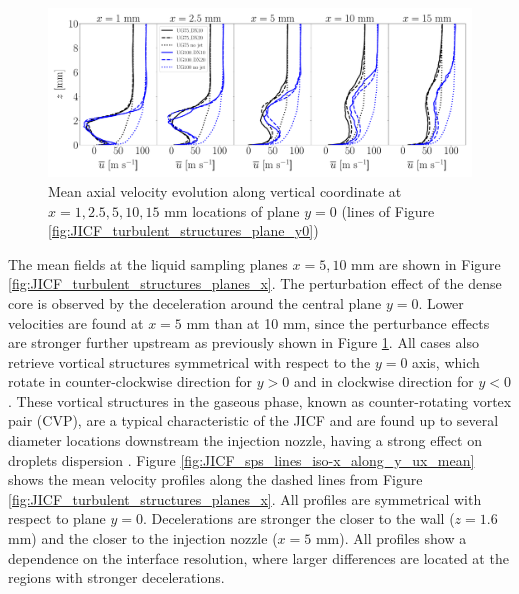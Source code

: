 \begin{figure}[ht]
\flushleft
   \includegraphics[scale=0.24]{./part2_developments/figures_ch5_resolved_JICF/turbulent_structures/lines_y0_along_z_ux_mean}
\caption{Mean axial velocity evolution along vertical coordinate at $x = 1, 2.5, 5, 10, 15$ mm locations of plane $y = 0$ (lines of Figure \ref{fig:JICF_turbulent_structures_plane_y0})}
\label{fig:JICF_sps_lines_y0_along_z_ux_mean}
\end{figure}


The mean fields at the liquid sampling planes $x = 5, 10$ mm are shown in Figure \ref{fig:JICF_turbulent_structures_planes_x}.  The perturbation effect of the dense core is observed by the deceleration around the central plane $y = 0$. Lower velocities are found at $x = 5$ mm than at 10 mm, since the perturbance effects are stronger further upstream as previously shown in Figure \ref{fig:JICF_sps_lines_y0_along_z_ux_mean}. All cases also retrieve vortical structures symmetrical with respect to the $y = 0$ axis, which rotate in counter-clockwise direction for $y > 0$ and in clockwise direction for  $y < 0$. These vortical structures in the gaseous phase, known as counter-rotating vortex pair (CVP), are a typical characteristic of the JICF and are found up to several diameter locations downstream the injection nozzle, having a strong effect on droplets dispersion . Figure \ref{fig:JICF_sps_lines_iso-x_along_y_ux_mean} shows the mean velocity profiles along the dashed lines from Figure \ref{fig:JICF_turbulent_structures_planes_x}. All profiles are symmetrical with respect to plane $y = 0$. Decelerations are stronger the closer to the wall ($z = 1.6$ mm) and the closer to the injection nozzle ($x = 5$ mm). All profiles show a dependence on the interface resolution, where larger differences are located at the regions with stronger decelerations. %

